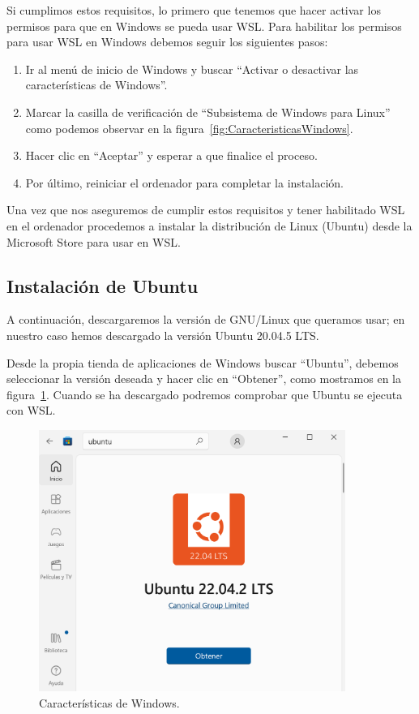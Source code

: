 \documentclass[a4paper, 12pt]{book}
\begin{document}
Si cumplimos estos requisitos, lo primero que tenemos que hacer activar los permisos para que en Windows se pueda usar WSL.
Para habilitar los permisos para usar WSL en Windows debemos seguir los siguientes pasos:
\begin{enumerate}
  \item Ir al menú de inicio de Windows y buscar ``Activar o desactivar las características de Windows''.
  \item Marcar la casilla de verificación de ``Subsistema de Windows para Linux'' como podemos observar en la figura~\ref{fig:CaracteristicasWindows}.
  \item Hacer clic en ``Aceptar'' y esperar a que finalice el proceso. 
  \item Por último, reiniciar el ordenador para completar la instalación.
\end{enumerate} 
  

Una vez que nos aseguremos de cumplir estos requisitos y tener habilitado WSL en el ordenador procedemos a instalar la distribución de Linux (Ubuntu) desde la Microsoft Store para usar en WSL. 

\subsection{Instalación de Ubuntu} %
\label{sec:instalación de ubuntu}

A continuación, descargaremos la versión de GNU/Linux que queramos usar; en nuestro caso hemos descargado la versión Ubuntu 20.04.5 LTS.


Desde la propia tienda de aplicaciones de Windows buscar ``Ubuntu'', debemos seleccionar la versión deseada y hacer clic en ``Obtener'', como mostramos en la figura~\ref{fig:ubuntu}.
Cuando se ha descargado podremos comprobar que Ubuntu se ejecuta con WSL.

\begin{figure}
  \centering
  \includegraphics[width=10cm, keepaspectratio]{img/Ubuntu.PNG}
  \caption{Características de Windows.}\label{fig:ubuntu}
\end{figure}
\end{document}
